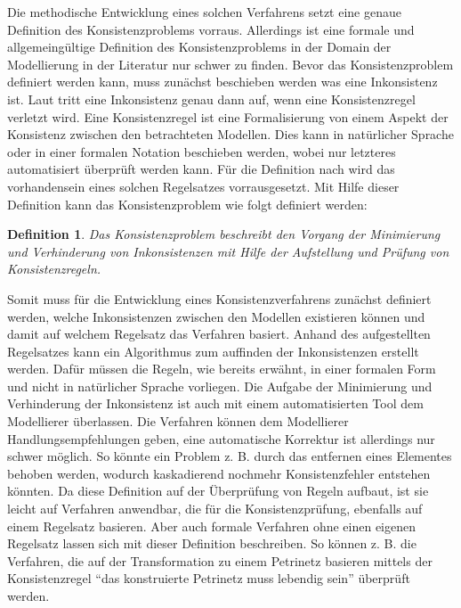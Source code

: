 Die methodische Entwicklung eines solchen Verfahrens setzt eine genaue Definition des Konsistenzproblems vorraus.
Allerdings ist eine formale und allgemeingültige Definition des Konsistenzproblems in der Domain der Modellierung in der Literatur nur schwer zu finden.
Bevor das Konsistenzproblem definiert werden kann, muss zunächst beschieben werden was eine Inkonsistenz ist.
Laut \cite{Nuseibeh1996} tritt eine Inkonsistenz genau dann auf, wenn eine Konsistenzregel verletzt wird.
Eine Konsistenzregel ist eine Formalisierung von einem Aspekt der Konsistenz zwischen den betrachteten Modellen.
Dies kann in natürlicher Sprache oder in einer formalen Notation beschieben werden, wobei nur letzteres automatisiert überprüft werden kann.
Für die Definition nach \cite{Nuseibeh1996} wird das vorhandensein eines solchen Regelsatzes vorrausgesetzt.
Mit Hilfe dieser Definition kann das Konsistenzproblem wie folgt definiert werden:

\newtheorem*{konsistenzproblem}{Definition}

\begin{konsistenzproblem}
    Das Konsistenzproblem beschreibt den Vorgang der Minimierung und Verhinderung von Inkonsistenzen mit Hilfe der Aufstellung und Prüfung von Konsistenzregeln.
\end{konsistenzproblem}

Somit muss für die Entwicklung eines Konsistenzverfahrens zunächst definiert werden, welche Inkonsistenzen zwischen den Modellen existieren können und damit auf welchem Regelsatz das Verfahren basiert.
Anhand des aufgestellten Regelsatzes kann ein Algorithmus zum auffinden der Inkonsistenzen erstellt werden.
Dafür müssen die Regeln, wie bereits erwähnt, in einer formalen Form und nicht in natürlicher Sprache vorliegen.
Die Aufgabe der Minimierung und Verhinderung der Inkonsistenz ist auch mit einem automatisierten Tool dem Modellierer überlassen.
Die Verfahren können dem Modellierer Handlungsempfehlungen geben, eine automatische Korrektur ist allerdings nur schwer möglich.
So könnte ein Problem z. B. durch das entfernen eines Elementes behoben werden, wodurch kaskadierend nochmehr Konsistenzfehler entstehen könnten.
Da diese Definition auf der Überprüfung von Regeln aufbaut, ist sie leicht auf Verfahren anwendbar, die für die Konsistenzprüfung, ebenfalls auf einem Regelsatz basieren.
Aber auch formale Verfahren ohne einen eigenen Regelsatz lassen sich mit dieser Definition beschreiben.
So können z. B. die Verfahren, die auf der Transformation zu einem Petrinetz basieren mittels der Konsistenzregel ``das konstruierte Petrinetz muss lebendig sein'' überprüft werden.

